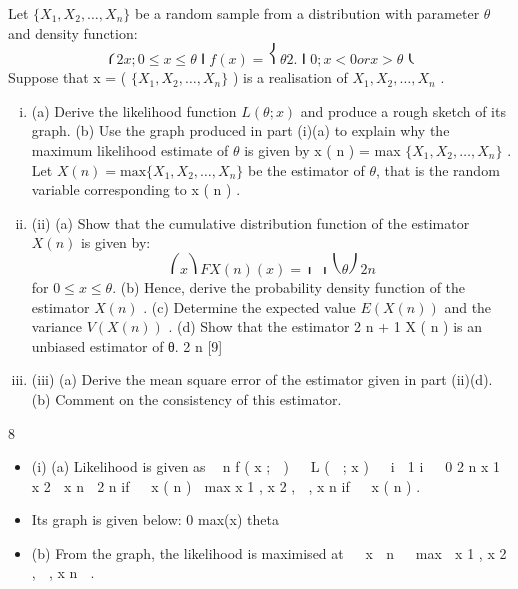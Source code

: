 \documentclass[a4paper,12pt]{article}
\begin{document}
\begin{enumerate}

Let $\{X_1 , X_2 , \ldots , X_n\}$ be a random sample from a distribution with parameter $\theta$ and
density function:
\[
⎧ 2 x
; 0 ≤ x ≤θ
⎪
f ( x ) = ⎨ θ 2
.
⎪ 0
; x < 0 or x > θ
⎩
\]
Suppose that x = ( $\{X_1 , X_2 , \ldots , X_n\}$ ) is a realisation of $X_1 , X_2 , \ldots , X_n$ .
\begin{enumerate}[(i)]
\item (a) Derive the likelihood function $L(\theta; x)$ and produce a rough sketch of its graph.
(b) Use the graph produced in part (i)(a) to explain why the maximum likelihood estimate of $\theta$ is given by x ( n ) = max{ $\{X_1 , X_2 , \ldots , X_n\}$ } .
Let $X ( n ) = \mbox{max}\{ X_1 , X_2 , \ldots , X_n\}$ be the estimator of $\theta$, that is the random variable corresponding to x ( n ) .
\item (ii)
(a)
Show that the cumulative distribution function of the estimator $X ( n )$ is
given by:
\[⎛ x ⎞
F X ( n ) ( x ) = ⎜ ⎟
⎝ θ ⎠
2 n\]
for $0 \leq x \leq \theta$.
(b) Hence, derive the probability density function of the estimator $X ( n )$ .
(c) Determine the expected value $E ( X ( n ) )$ and the variance $V ( X ( n ) )$ .
(d) Show that the estimator
2 n + 1
X ( n ) is an unbiased estimator of θ.
2 n
[9]
\item (iii)
(a) Derive the mean square error of the estimator given in part (ii)(d).
(b) Comment on the consistency of this estimator.

\end{enumerate}
\newpage

8
\begin{itemize}
\item (i)
(a)
Likelihood is given as
 n f ( x ;  ) 

L (  ; x )   i  1 i
  0
2 n x 1 x 2  x n
 2 n
if   x ( n )  max{ x 1 , x 2 ,  , x n }
if   x ( n ) .
\item Its graph is given below:
0
max(x)
theta
\item (b)
From the graph, the likelihood is maximised at
  x  n   max  x 1 , x 2 ,  , x n  .


\end{itemize}
\end{enumerate}
\end{document}
